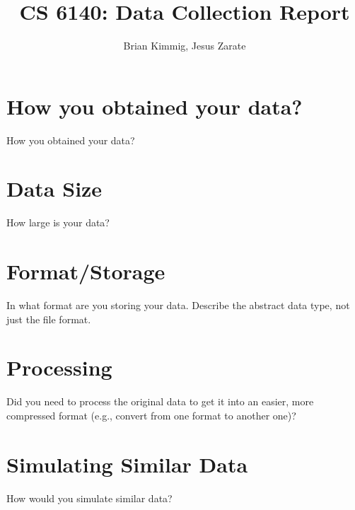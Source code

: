 \documentclass[12pt]{article}
\title{CS 6140: Data Collection Report}
\author{Brian Kimmig, Jesus Zarate}
\date{}
\begin{document}
\maketitle

\section{How you obtained your data?}
How you obtained your data?

\section{Data Size}
How large is your data?

\section{Format/Storage}
In what format are you storing your data. Describe the abstract data type, not just the file format.

\section{Processing}
Did you need to process the original data to get it into an easier, more compressed format (e.g., convert from one format to another one)?

\section{Simulating Similar Data}
How would you simulate similar data?
\end{document}
